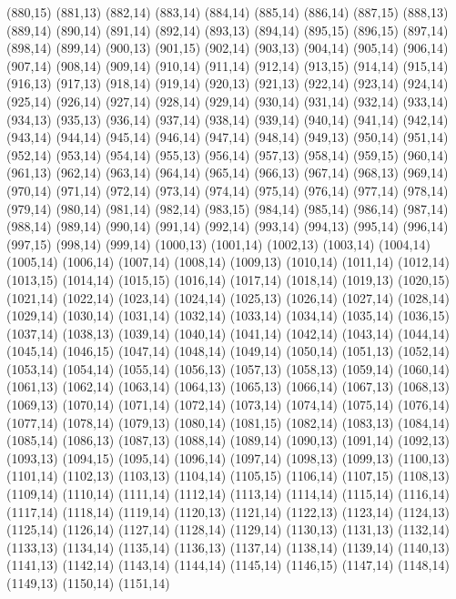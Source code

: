 (880,15)
(881,13)
(882,14)
(883,14)
(884,14)
(885,14)
(886,14)
(887,15)
(888,13)
(889,14)
(890,14)
(891,14)
(892,14)
(893,13)
(894,14)
(895,15)
(896,15)
(897,14)
(898,14)
(899,14)
(900,13)
(901,15)
(902,14)
(903,13)
(904,14)
(905,14)
(906,14)
(907,14)
(908,14)
(909,14)
(910,14)
(911,14)
(912,14)
(913,15)
(914,14)
(915,14)
(916,13)
(917,13)
(918,14)
(919,14)
(920,13)
(921,13)
(922,14)
(923,14)
(924,14)
(925,14)
(926,14)
(927,14)
(928,14)
(929,14)
(930,14)
(931,14)
(932,14)
(933,14)
(934,13)
(935,13)
(936,14)
(937,14)
(938,14)
(939,14)
(940,14)
(941,14)
(942,14)
(943,14)
(944,14)
(945,14)
(946,14)
(947,14)
(948,14)
(949,13)
(950,14)
(951,14)
(952,14)
(953,14)
(954,14)
(955,13)
(956,14)
(957,13)
(958,14)
(959,15)
(960,14)
(961,13)
(962,14)
(963,14)
(964,14)
(965,14)
(966,13)
(967,14)
(968,13)
(969,14)
(970,14)
(971,14)
(972,14)
(973,14)
(974,14)
(975,14)
(976,14)
(977,14)
(978,14)
(979,14)
(980,14)
(981,14)
(982,14)
(983,15)
(984,14)
(985,14)
(986,14)
(987,14)
(988,14)
(989,14)
(990,14)
(991,14)
(992,14)
(993,14)
(994,13)
(995,14)
(996,14)
(997,15)
(998,14)
(999,14)
(1000,13)
(1001,14)
(1002,13)
(1003,14)
(1004,14)
(1005,14)
(1006,14)
(1007,14)
(1008,14)
(1009,13)
(1010,14)
(1011,14)
(1012,14)
(1013,15)
(1014,14)
(1015,15)
(1016,14)
(1017,14)
(1018,14)
(1019,13)
(1020,15)
(1021,14)
(1022,14)
(1023,14)
(1024,14)
(1025,13)
(1026,14)
(1027,14)
(1028,14)
(1029,14)
(1030,14)
(1031,14)
(1032,14)
(1033,14)
(1034,14)
(1035,14)
(1036,15)
(1037,14)
(1038,13)
(1039,14)
(1040,14)
(1041,14)
(1042,14)
(1043,14)
(1044,14)
(1045,14)
(1046,15)
(1047,14)
(1048,14)
(1049,14)
(1050,14)
(1051,13)
(1052,14)
(1053,14)
(1054,14)
(1055,14)
(1056,13)
(1057,13)
(1058,13)
(1059,14)
(1060,14)
(1061,13)
(1062,14)
(1063,14)
(1064,13)
(1065,13)
(1066,14)
(1067,13)
(1068,13)
(1069,13)
(1070,14)
(1071,14)
(1072,14)
(1073,14)
(1074,14)
(1075,14)
(1076,14)
(1077,14)
(1078,14)
(1079,13)
(1080,14)
(1081,15)
(1082,14)
(1083,13)
(1084,14)
(1085,14)
(1086,13)
(1087,13)
(1088,14)
(1089,14)
(1090,13)
(1091,14)
(1092,13)
(1093,13)
(1094,15)
(1095,14)
(1096,14)
(1097,14)
(1098,13)
(1099,13)
(1100,13)
(1101,14)
(1102,13)
(1103,13)
(1104,14)
(1105,15)
(1106,14)
(1107,15)
(1108,13)
(1109,14)
(1110,14)
(1111,14)
(1112,14)
(1113,14)
(1114,14)
(1115,14)
(1116,14)
(1117,14)
(1118,14)
(1119,14)
(1120,13)
(1121,14)
(1122,13)
(1123,14)
(1124,13)
(1125,14)
(1126,14)
(1127,14)
(1128,14)
(1129,14)
(1130,13)
(1131,13)
(1132,14)
(1133,13)
(1134,14)
(1135,14)
(1136,13)
(1137,14)
(1138,14)
(1139,14)
(1140,13)
(1141,13)
(1142,14)
(1143,14)
(1144,14)
(1145,14)
(1146,15)
(1147,14)
(1148,14)
(1149,13)
(1150,14)
(1151,14)
